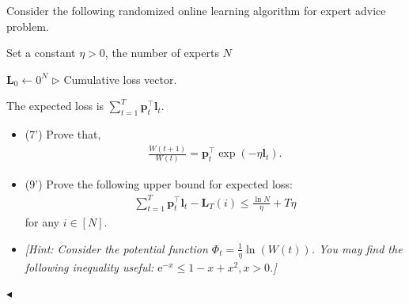 \documentclass[11pt]{article}
\newenvironment{problem}[2][Problem]{\begin{trivlist}
\item[\hskip \labelsep {\bfseries #1}\hskip \labelsep {\bfseries #2.}]}{\hfill$\blacktriangleleft$\end{trivlist}}
\begin{document}
\begin{problem}{3 (16')} Consider the following randomized online learning algorithm for expert advice problem.
    \begin{algorithm}[htbp]
        \caption{Randomized online learning algorithm for expert advice}
        Set a constant $\eta>0$, the number of experts $N$
    
        $\bm{L}_0\gets 0^N$ \hfill{$\triangleright$ Cumulative loss vector.}
    
    \end{algorithm}
    
    The expected loss is $\sum_{t=1}^T\bm{p}_t^\top\bm{l}_t$. 
    \begin{itemize}
        \item [(1)] (7') Prove that, 
        \begin{align*}
            \frac{W(t+1)}{W(t)}=\bm{p}_t^\top\exp(-\eta\bm{l}_t).
        \end{align*}
        \item [(2)] (9') Prove the following upper bound for expected loss:
        \begin{align*}
            \sum_{t=1}^T\bm{p}_t^\top\bm{l}_t-\bm L_T(i)\leq\frac{\ln N}{\eta}+T\eta
        \end{align*}
        for any $i\in[N]$.
        \item [] \textit{[Hint: Consider the potential function $\Phi_t=\frac{1}{\eta}\ln(W(t))$. You may find the following inequality useful: $\mathrm{e}^{-x}\leq 1-x+x^2,x>0$.]}
    \end{itemize}
\end{problem}
\end{document}
